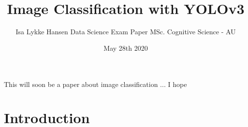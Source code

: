 \documentclass[12pt]{article}
\title{Image Classification with YOLOv3}
\author{\parbox{\linewidth}{\centering%
Isa Lykke Hansen\endgraf\bigskip
Data Science Exam Paper \endgraf
MSc. Cognitive Science - AU}}
\date{May 28th 2020}
\begin{document}
\onehalfspacing

\begin{titlepage}
	\maketitle
	\newpage
\end{titlepage}


\abstract{}
This will soon be a paper about image classification ... I hope

\section{Introduction}



















\clearpage
\appto{\bibsetup}{\raggedright}
\printbibliography
\end{document}
